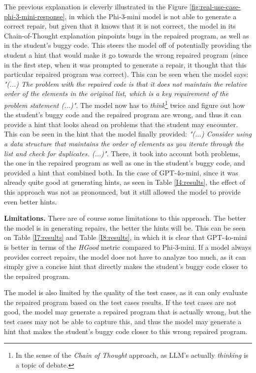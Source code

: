 \documentclass{article}
\begin{document}
The previous explanation is cleverly illustrated in the Figure \ref{fig:real-use-case-phi-3-mini-response}, in which the Phi-3-mini model is not able to generate a correct repair, but given that it knows that it is not correct, the model in its Chain-of-Thought explanation pinpoints bugs in the repaired program, as well as in the student's buggy code. This steers the model off of potentially providing the student a hint that would make it go towards the wrong repaired program (since in the first step, when it was prompted to generate a repair, it thought that this particular repaired program was correct). This can be seen when the model says: \textit{"(...) The problem with the repaired code is that it does not maintain the relative order of the elements in the original list, which is a key requirement of the problem statement (...)"}. The model now has to \textit{think}\footnote{In the sense of the \textit{Chain of Thought} approach, as LLM's actually \textit{thinking} is a topic of debate.} twice and figure out how the student's buggy code and the repaired program are wrong, and thus it can provide a hint that looks ahead on problems that the student may encounter. This can be seen in the hint that the model finally provided: \textit{"(...) Consider using a data structure that maintains the order of elements as you iterate through the list and check for duplicates. (...)"}. There, it took into account both problems, the one in the repaired program as well as one in the student's buggy code, and provided a hint that combined both. In the case of GPT-4o-mini, since it was already quite good at generating hints, as seen in Table \ref{I4:results}, the effect of this approach was not as pronounced, but it still allowed the model to provide even better hints.

\textbf{Limitations.} There are of course some limitations to this approach. The better the model is in generating repairs, the better the hints will be. This can be seen on Table \ref{I7:results} and Table \ref{I8:results}, in which it is clear that GPT-4o-mini is better in terms of the \textit{HGood} metric compared to Phi-3-mini. If a model always provides correct repairs, the model does not have to analyze too much, as it can simply give a concise hint that directly makes the student's buggy code closer to the repaired program.

The model is also limited by the quality of the test cases, as it can only evaluate the repaired program based on the test cases results. If the test cases are not good, the model may generate a repaired program that is actually wrong, but the test cases may not be able to capture this, and thus the model may generate a hint that makes the student's buggy code closer to this wrong repaired program.
\end{document}
